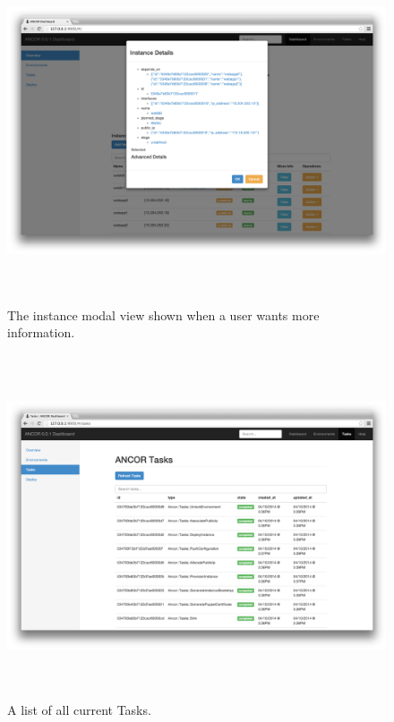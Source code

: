\begin{figure}[htb]%

    \includegraphics[height=4.0in]{figures/instance-modal-view.png}

    \caption[Instance modal view.
    ]{The instance modal view shown when a user wants more information.}

    \label{modalInstanceView}
\end{figure}

\begin{figure}[htb]%

    \includegraphics[height=4.0in]{figures/tasks.png}

    \caption[Tasks view.
    ]{A list of all current Tasks.}

    \label{tasksView}
\end{figure}

